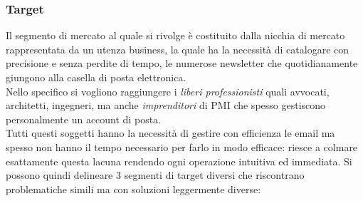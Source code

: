 \subsubsection{Target}
Il segmento di mercato al quale \NOMEPROGETTO{} si rivolge è costituito dalla nicchia di mercato rappresentata da un utenza business, la quale ha la necessità di catalogare con precisione e senza perdite di tempo, le numerose newsletter che quotidianamente giungono alla casella di posta elettronica.\\
Nello specifico si vogliono raggiungere i \emph{liberi professionisti} quali avvocati, architetti, ingegneri, ma anche \emph{imprenditori} di PMI che spesso gestiscono personalmente un account di posta.\\
Tutti questi soggetti hanno la necessità di gestire con efficienza le email ma spesso non hanno il tempo necessario per farlo in modo efficace: \NOMEPROGETTO{} riesce a colmare esattamente questa lacuna rendendo ogni operazione intuitiva ed immediata.
Si possono quindi delineare 3 segmenti di target diversi che riscontrano problematiche simili ma con soluzioni leggermente diverse:
